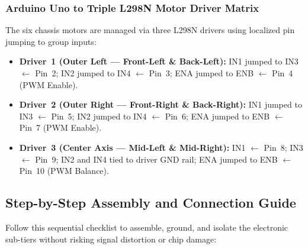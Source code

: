 \documentclass[conference]{IEEEtran}
\begin{document}
\subsubsection{Arduino Uno to Triple L298N Motor Driver Matrix}
The six chassis motors are managed via three L298N drivers using localized pin jumping to group inputs:
\begin{itemize}
    \item \textbf{Driver~1 (Outer Left — Front-Left \& Back-Left):}
        IN1 jumped to IN3 $\longleftarrow$ Pin~2;\quad
        IN2 jumped to IN4 $\longleftarrow$ Pin~3;\quad
        ENA jumped to ENB $\longleftarrow$ Pin~4 (PWM Enable).
    \item \textbf{Driver~2 (Outer Right — Front-Right \& Back-Right):}
        IN1 jumped to IN3 $\longleftarrow$ Pin~5;\quad
        IN2 jumped to IN4 $\longleftarrow$ Pin~6;\quad
        ENA jumped to ENB $\longleftarrow$ Pin~7 (PWM Enable).
    \item \textbf{Driver~3 (Center Axis — Mid-Left \& Mid-Right):}
        IN1 $\longleftarrow$ Pin~8;\quad
        IN3 $\longleftarrow$ Pin~9;\quad
        IN2 and IN4 tied to driver GND rail;\quad
        ENA jumped to ENB $\longleftarrow$ Pin~10 (PWM Balance).
\end{itemize}

\subsection{Step-by-Step Assembly and Connection Guide}
Follow this sequential checklist to assemble, ground, and isolate the electronic sub-tiers without risking signal distortion or chip damage:
\end{document}
